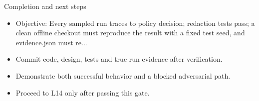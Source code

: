 \documentclass[aspectratio=169,10pt]{beamer}
\begin{document}
\begin{frame}{Completion and next steps}
\small
\begin{itemize}
\item Objective: Every sampled run traces to policy decision; redaction tests pass; a clean offline checkout must reproduce the result with a fixed test seed, and evidence.json must re...
\item Commit code, design, tests and true run evidence after verification.
\item Demonstrate both successful behavior and a blocked adversarial path.
\item Proceed to L14 only after passing this gate.
\end{itemize}

\end{frame}
\end{document}
